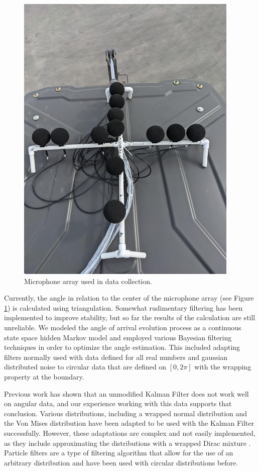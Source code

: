 \documentclass[11pt]{amsart}
\begin{document}
\begin{figure}[htp]
\includegraphics*[width=0.95\textwidth]{Pic of Real Mic Array.jpg}\hfill
\caption{Microphone array used in data collection.}
\label{fig:array}
\end{figure}

Currently, the angle in relation to the center of the microphone array (see Figure \ref{fig:array}) is calculated using triangulation. Somewhat rudimentary filtering has been implemented to 
improve stability, but so far the results of the calculation are still unreliable. We modeled the angle of arrival evolution process as a continuous state space 
hidden Markov model and employed various Bayesian filtering techniques in order to optimize the angle estimation. This included adapting filters normally used 
with data defined for all real numbers and gaussian distributed noise to circular data that are defined on $[0,2\pi]$ with the wrapping property at the boundary.

Previous work has shown that an unmodified Kalman Filter does not work well on angular data, and our experience working with this data supports that conclusion. 
Various distributions, including a wrapped normal distribution and the Von Mises distribution have been adapted to be used with the Kalman Filter successfully. 
However, these adaptations are complex and not easily implemented, as they include approximating the distributions with a wrapped Dirac mixture \cite{Research}. Particle filters 
are a type of filtering algorithm that allow for the use of an arbitrary distribution and have been used with circular distributions before.
\end{document}
